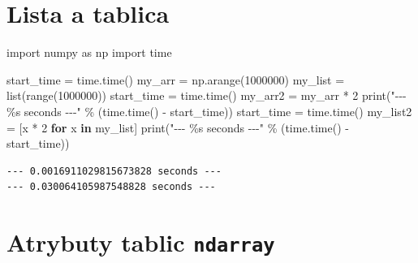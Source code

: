 \documentclass[
  letterpaper,
  DIV=11,
  numbers=noendperiod]{scrreprt}
\newenvironment{Shaded}{\begin{snugshade}}{\end{snugshade}}
\newcommand{\BuiltInTok}[1]{\textcolor[rgb]{0.00,0.23,0.31}{#1}}
\newcommand{\ControlFlowTok}[1]{\textcolor[rgb]{0.00,0.23,0.31}{\textbf{#1}}}
\newcommand{\DecValTok}[1]{\textcolor[rgb]{0.68,0.00,0.00}{#1}}
\newcommand{\ImportTok}[1]{\textcolor[rgb]{0.00,0.46,0.62}{#1}}
\newcommand{\KeywordTok}[1]{\textcolor[rgb]{0.00,0.23,0.31}{\textbf{#1}}}
\newcommand{\NormalTok}[1]{\textcolor[rgb]{0.00,0.23,0.31}{#1}}
\newcommand{\OperatorTok}[1]{\textcolor[rgb]{0.37,0.37,0.37}{#1}}
\newcommand{\SpecialCharTok}[1]{\textcolor[rgb]{0.37,0.37,0.37}{#1}}
\newcommand{\StringTok}[1]{\textcolor[rgb]{0.13,0.47,0.30}{#1}}
\begin{document}
\chapter{Lista a tablica}\label{lista-a-tablica}

\begin{Shaded}
\begin{Highlighting}[]
\ImportTok{import}\NormalTok{ numpy }\ImportTok{as}\NormalTok{ np}
\ImportTok{import}\NormalTok{ time}

\NormalTok{start\_time }\OperatorTok{=}\NormalTok{ time.time()}
\NormalTok{my\_arr }\OperatorTok{=}\NormalTok{ np.arange(}\DecValTok{1000000}\NormalTok{)}
\NormalTok{my\_list }\OperatorTok{=} \BuiltInTok{list}\NormalTok{(}\BuiltInTok{range}\NormalTok{(}\DecValTok{1000000}\NormalTok{))}
\NormalTok{start\_time }\OperatorTok{=}\NormalTok{ time.time()}
\NormalTok{my\_arr2 }\OperatorTok{=}\NormalTok{ my\_arr }\OperatorTok{*} \DecValTok{2}
\BuiltInTok{print}\NormalTok{(}\StringTok{"{-}{-}{-} }\SpecialCharTok{\%s}\StringTok{ seconds {-}{-}{-}"} \OperatorTok{\%}\NormalTok{ (time.time() }\OperatorTok{{-}}\NormalTok{ start\_time))}
\NormalTok{start\_time }\OperatorTok{=}\NormalTok{ time.time()}
\NormalTok{my\_list2 }\OperatorTok{=}\NormalTok{ [x }\OperatorTok{*} \DecValTok{2} \ControlFlowTok{for}\NormalTok{ x }\KeywordTok{in}\NormalTok{ my\_list]}
\BuiltInTok{print}\NormalTok{(}\StringTok{"{-}{-}{-} }\SpecialCharTok{\%s}\StringTok{ seconds {-}{-}{-}"} \OperatorTok{\%}\NormalTok{ (time.time() }\OperatorTok{{-}}\NormalTok{ start\_time))}
\end{Highlighting}
\end{Shaded}

\begin{verbatim}
--- 0.0016911029815673828 seconds ---
--- 0.030064105987548828 seconds ---
\end{verbatim}

\chapter{\texorpdfstring{Atrybuty tablic
\texttt{ndarray}}{Atrybuty tablic ndarray}}\label{atrybuty-tablic-ndarray}
\end{document}
